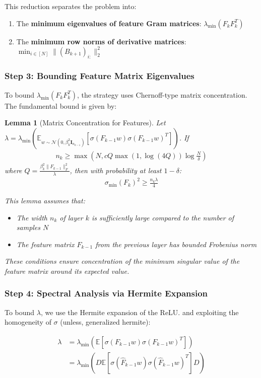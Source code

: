 \documentclass{article}
\newtheorem{lemma}[theorem]{Lemma}
\newcommand{\E}{\mathbb{E}}
\newcommand{\evmin}[1]{\lambda_{\min}\left(#1\right)}
\newcommand{\svmin}[1]{\sigma_{\min}\left(#1\right)}
\begin{document}
This reduction separates the problem into:
\begin{enumerate}
    \item The \textbf{minimum eigenvalues of feature Gram matrices}: $\evmin{F_k F_k^T}$
    \item The \textbf{minimum row norms of derivative matrices}: $\min_{i \in [N]} \|(B_{k+1})_{i:}\|_2^2$
\end{enumerate}

\subsubsection{Step 3: Bounding Feature Matrix Eigenvalues}

To bound $\evmin{F_k F_k^T}$, the strategy uses Chernoff-type matrix concentration. The fundamental bound is given by:
\begin{lemma}[Matrix Concentration for Features]
Let $\lambda = \evmin{\E_{w \sim \mathcal{N}(0, \beta_k^2 \mathbf{I}_{n_{k-1}})}[\sigma(F_{k-1}w)\sigma(F_{k-1}w)^T]}$. If 
\begin{align}
n_k \geq \max\left(N, c Q \max(1, \log(4Q)) \log\frac{N}{\delta}\right)
\end{align}
where $Q = \frac{\beta_k^2 \|F_{k-1}\|_F^2}{\lambda}$, then with probability at least $1-\delta$:
\begin{align}
\svmin{F_k}^2 \geq \frac{n_k \lambda}{4}
\end{align}

This lemma assumes that:
\begin{itemize}
\item The width $n_k$ of layer $k$ is sufficiently large compared to the number of samples $N$
\item The feature matrix $F_{k-1}$ from the previous layer has bounded Frobenius norm
\end{itemize}
These conditions ensure concentration of the minimum singular value of the feature matrix around its expected value.
\end{lemma}

\subsubsection{Step 4: Spectral Analysis via Hermite Expansion}

To bound $\lambda$, we use the Hermite expansion of the ReLU. and exploiting the homogeneity of $\sigma$ (unless, generalized hermite):

\begin{align}
\lambda &= \evmin{\E[\sigma(F_{k-1}w)\sigma(F_{k-1}w)^T]} \\
&= \evmin{D \E[\sigma(\hat{F}_{k-1}w)\sigma(\hat{F}_{k-1}w)^T] D}
\end{align}
\end{document}
